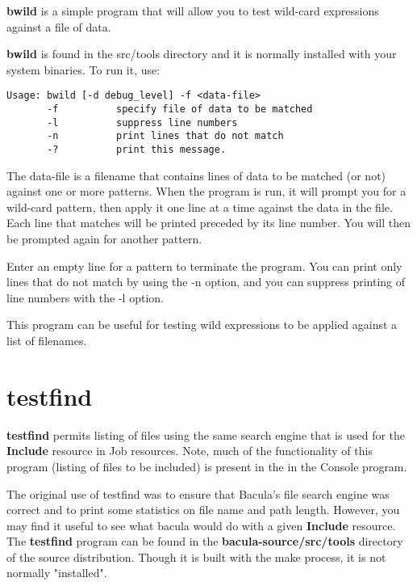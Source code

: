{\bf bwild} is a simple program that will allow you to test 
wild-card expressions against a file of data.

{\bf bwild} is found in the src/tools directory and it is 
normally installed with your system binaries. To run it, use:

\begin{verbatim}
Usage: bwild [-d debug_level] -f <data-file>
       -f          specify file of data to be matched
       -l          suppress line numbers
       -n          print lines that do not match
       -?          print this message.
\end{verbatim}

The \lt{}data-file\gt{} is a filename that contains lines
of data to be matched (or not) against one or more patterns.
When the program is run, it will prompt you for a wild-card
pattern, then apply it one line at a time against
the data in the file. Each line that matches will be printed 
preceded by its line number.  You will then be prompted again  
for another pattern.  

Enter an empty line for a pattern to terminate the program. You
can print only lines that do not match by using the -n option,
and you can suppress printing of line numbers with the -l option.

This program can be useful for testing wild expressions to be 
applied against a list of filenames.

\section{testfind}
\label{testfind}

{\bf testfind} permits listing of files using the same search engine that is
used for the {\bf Include} resource in Job resources. Note, much of the
functionality of this program (listing of files to be included) is present in
the 
 in the Console program. 

The original use of testfind was to ensure that Bacula's file search engine
was correct and to print some statistics on file name and path length.
However, you may find it useful to see what bacula would do with a given {\bf
Include} resource. The {\bf testfind} program can be found in the {\bf
\lt{}bacula-source\gt{}/src/tools} directory of the source distribution.
Though it is built with the make process, it is not normally "installed". 

